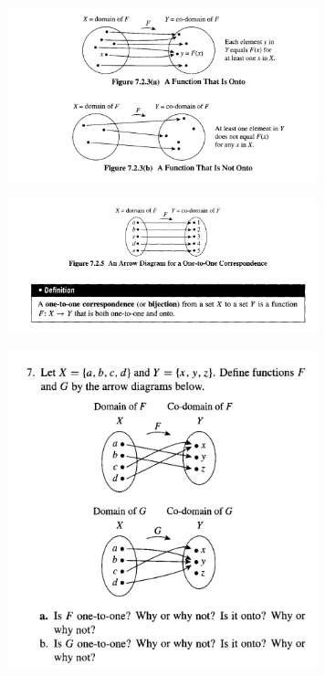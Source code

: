 \documentclass{article}
\begin{document}
\begin{figure}
\centering
\includegraphics[width=90mm]{8}
\end{figure}

\begin{figure}
\centering
\includegraphics[width=90mm]{9}
\end{figure}

\begin{figure}
\centering
\includegraphics[width=90mm]{10}
\end{figure}
\end{document}
